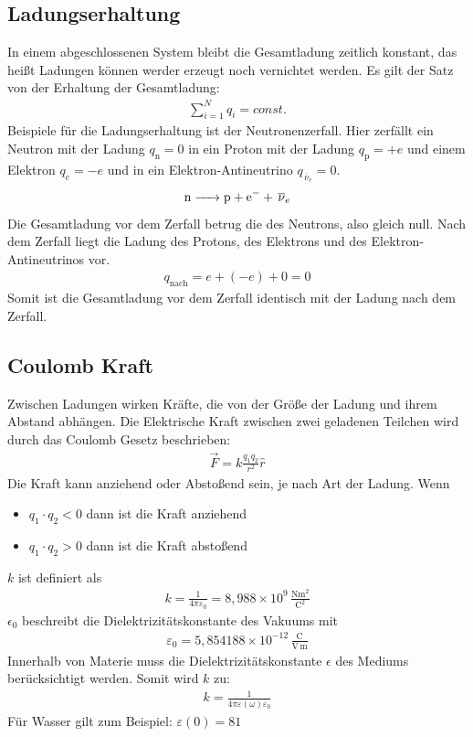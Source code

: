 \documentclass{scrartcl}
\begin{document}
\subsection{Ladungserhaltung}
In einem abgeschlossenen System bleibt die Gesamtladung zeitlich konstant, das heißt Ladungen können
werder erzeugt noch vernichtet werden. Es gilt der Satz von der Erhaltung der Gesamtladung:
\begin{align}
    \sum_{i=1}^N q_i=const.
\end{align}
Beispiele für die Ladungserhaltung ist der Neutronenzerfall.
Hier zerfällt ein Neutron mit der Ladung $q_\mathrm{n}=0$ in ein Proton
mit der Ladung $q_\mathrm{p}=+e$ und einem Elektron $q_e=-e$ und in ein Elektron-Antineutrino $q_{\,\overline{\nu}_e}=0$.
\begin{align}
    \ce{n -> p + e^- + \,\overline{\nu}_e}
\end{align}
Die Gesamtladung vor dem Zerfall betrug die des Neutrons, also gleich null. Nach dem Zerfall liegt die Ladung des Protons,
des Elektrons und des Elektron-Antineutrinos vor. 
\begin{align}
    q_\mathrm{nach}=e+(-e)+0=0
\end{align}
Somit ist die Gesamtladung vor dem Zerfall identisch mit der Ladung nach dem Zerfall.


\subsection{Coulomb Kraft}
Zwischen Ladungen wirken Kräfte, die von der Größe der Ladung und ihrem Abstand abhängen.
Die Elektrische Kraft zwischen zwei geladenen Teilchen wird durch das Coulomb Gesetz beschrieben:
\begin{align}
    \vec{F}=k\frac{q_1q_2}{r^2}\hat{r}
\end{align}
Die Kraft kann anziehend oder Abstoßend sein, je nach Art der Ladung.
Wenn 
\begin{itemize}
    \item $q_1\cdot q_2 < 0$ dann ist die Kraft anziehend
    \item $q_1\cdot q_2 > 0$ dann ist die Kraft abstoßend
\end{itemize}
$k$ ist definiert als 
\begin{align}
    k=\frac{1}{4\pi\varepsilon_0}=8,988\times 10^9\,\frac{\mathrm{Nm^2}}{\mathrm{C}^2}
\end{align}
$\epsilon_0$ beschreibt die Dielektrizitätskonstante des Vakuums mit 
\begin{align}
    \varepsilon_0=5,854188\times 10^{-12}\,\frac{\mathrm{C}}{\mathrm{V\,m}}
\end{align}
Innerhalb von Materie muss die Dielektrizitätskonstante $\epsilon$ des Mediums berücksichtigt werden.
Somit wird $k$ zu:
\begin{align}
    k=\frac{1}{4\pi\varepsilon(\omega)\varepsilon_0}
\end{align}
Für Wasser gilt zum Beispiel: $\varepsilon(0)=81$\\
\end{document}
